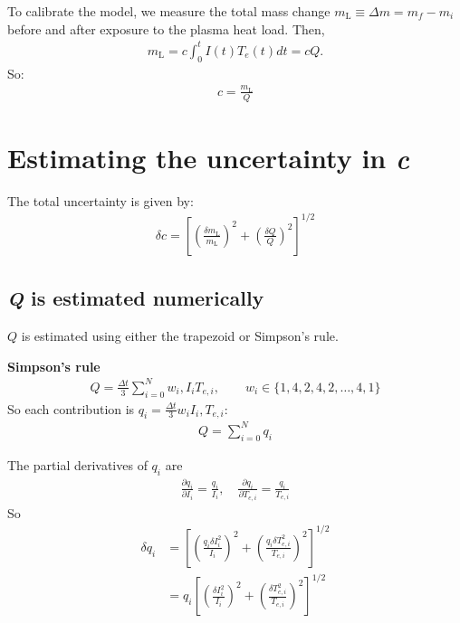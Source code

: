 \documentclass[11pt,twoside]{article}
\begin{document}
To calibrate the model, we measure the total mass change $m_{\mathrm{L}} \equiv \Delta m = m_f - m_i$ before and after exposure to the plasma heat load.
Then,
\begin{align}
m_{\mathrm{L}} = c \int_0^t I(t)  T_e(t) dt = cQ. \label{eq:mass-loss-integral}
\end{align}
So:
\begin{align}
c = \frac{m_{\mathrm{L}}}{Q} \label{eq:model-proportionality-constant}
\end{align}

\section{Estimating the uncertainty in \textit{c}}
The total uncertainty is given by:
\begin{align}
\delta c = \left[ \left( \frac{\delta m_{\mathrm{L}}}{m_{\mathrm{L}}} \right)^2 + \left(\frac{\delta Q}{Q}\right)^2 \right]^{1/2} \label{eq:uncertainty-c_implicit}
\end{align}

\subsection{\textit{Q} is estimated numerically}
$Q$ is estimated using either the trapezoid or Simpson's rule.

\textbf{Simpson's rule}
\begin{align}
Q = \frac{\Delta t}{3} \sum_{i=0}^N w_i, I_i T_{e,i}, \qquad w_i \in \{1,4,2,4,2,\ldots,4,1\}
\label{eq:Q-simpson}
\end{align}
So each contribution is $q_i = \frac{\Delta t}{3}w_i I_i, T_{e,i}$:
\begin{align*}
Q = \sum_{i=0}^N q_i
\end{align*}

The partial derivatives of $q_i$ are
\begin{align*}
\frac{\partial q_i}{\partial I_i} = \frac{q_i}{I_i}, \quad \frac{\partial q_i}{\partial T_{e,i}} = \frac{q_i}{T_{e,i}}
\end{align*}
So
\begin{align*}
\delta q_i &= \left[ \left( \frac{q_i \delta I_i^2}{I_i} \right)^2 + \left( \frac{q_i \delta T_{e,i}^2}{T_{e,i}} \right)^2 \right]^{1/2} \\
&= q_i\left[ \left( \frac{\delta I_i^2}{I_i} \right)^2 + \left( \frac{\delta T_{e,i}^2}{T_{e,i}} \right)^2 \right]^{1/2}
\end{align*}
\end{document}
